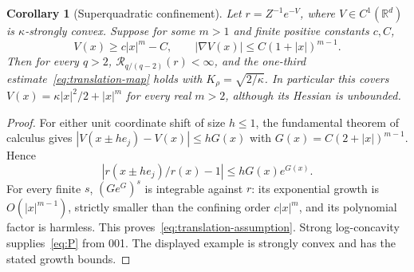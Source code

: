 \documentclass[11pt]{article}
\newtheorem{corollary}[theorem]{Corollary}
\theoremstyle{remark}\newtheorem{remark}[theorem]{Remark}
\newcommand{\R}{\mathbb R}\newcommand{\Var}{\operatorname{Var}}
\begin{document}
\begin{corollary}[Superquadratic confinement]\label{cor:polynomial}
Let $r=Z^{-1}e^{-V}$, where $V\in C^1(\R^d)$ is $\kappa$-strongly convex. Suppose for some $m>1$ and finite positive constants $c,C$,
\[
 V(x)\ge c|x|^m-C,\qquad
 |\nabla V(x)|\le C(1+|x|)^{m-1}.
\]
Then for every $q>2$, $\mathcal R_{q/(q-2)}(r)<\infty$, and the one-third estimate~\eqref{eq:translation-map} holds with $K_\rho=\sqrt{2/\kappa}$.
In particular this covers $V(x)=\kappa|x|^2/2+|x|^m$ for every real $m>2$, although its Hessian is unbounded.
\end{corollary}
\begin{proof}
For either unit coordinate shift of size $h\le1$, the fundamental theorem of calculus gives
$|V(x\pm he_j)-V(x)|\le hG(x)$ with
$G(x)=C(2+|x|)^{m-1}$. Hence
\[
 \left|r(x\pm he_j)/r(x)-1\right|
 \le hG(x)e^{G(x)}.
\]
For every finite $s$, $(G e^G)^s$ is integrable against $r$: its exponential growth is $O(|x|^{m-1})$, strictly smaller than the confining order $c|x|^m$, and its polynomial factor is harmless. This proves~\eqref{eq:translation-assumption}. Strong log-concavity supplies~\eqref{eq:P} from 001. The displayed example is strongly convex and has the stated growth bounds.
\end{proof}
\end{document}
